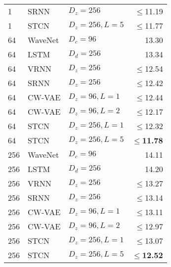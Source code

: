 {\begin{table}
\begin{subtable}[t]{.485\textwidth}
\begin{adjustbox}{center, totalheight=0.37\paperheight}
\begin{tabular}[t]{lll|r}
        1 & SRNN                & $D_z=256$                   & $\leq$11.19 \\  %
        1 & STCN                & $D_z=256,L=5$               & $\leq$11.77 \\  %
        \midrule
        64 & WaveNet            & $D_c=96$                    & 13.30 \\  %
        64 & LSTM               & $D_d=256$                   & 13.34 \\  %
        64 & VRNN               & $D_z=256$                   & $\leq$12.54 \\  %
        64 & SRNN               & $D_z=256$                   & $\leq$12.42 \\  %
        64 & CW-VAE             & $D_z=96,L=1$                & $\leq$12.44 \\
        64 & CW-VAE             & $D_z=96,L=2$                & $\leq$12.17 \\
        64 & STCN               & $D_z=256,L=1$               & $\leq$12.32 \\  %
        64 & STCN               & $D_z=256,L=5$               & $\leq$\textbf{11.78} \\
        \midrule
        256 & WaveNet           & $D_c=96$                    & 14.11 \\  %
        256 & LSTM              & $D_d=256$                   & 14.20 \\  %
        256 & VRNN              & $D_z=256$                   & $\leq$13.27 \\  %
        256 & SRNN              & $D_z=256$                   & $\leq$13.14 \\  %
        256 & CW-VAE            & $D_z=96,L=1$                & $\leq$13.11 \\
        256 & CW-VAE            & $D_z=96,L=2$                & $\leq$12.97 \\
        256 & STCN              & $D_z=256,L=1$               & $\leq$13.07 \\  %
        256 & STCN              & $D_z=256,L=5$               & $\leq$\textbf{12.52} \\
        \bottomrule
    \end{tabular}

\end{adjustbox}
\end{subtable}
\end{table}}
